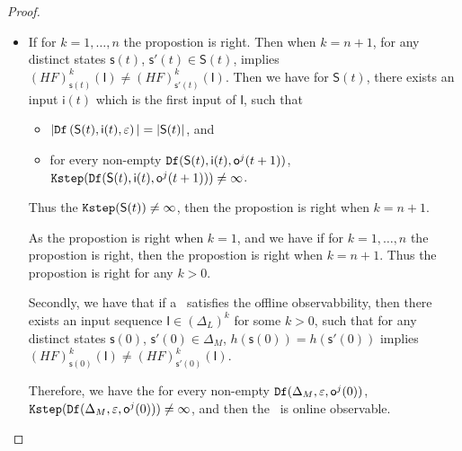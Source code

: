 \begin{appendices}
\begin{proof}
\begin{itemize}
\item If for $k=1,\ldots, n$ the propostion is right. Then when $k=n+1$, for any distinct states $\mathsf{s}(t)$, $\mathsf{s}'(t) \in \mathsf{S}(t)$, implies $(HF)^{k}_{\mathsf{s}(t)}(\mathsf{I})\neq (HF)^{k}_{\mathsf{s}'(t)}(\mathsf{I})$. Then we have for $\mathsf{S}(t)$,
 there exists an input $\mathsf{i}(t)$ which is the first input of $\mathsf{I}$, such that
 \begin{itemize}
\item  $|{\tt Df}\left(\mathsf{S}(t),\mathsf{i}(t),\varepsilon\right)|=|\mathsf{S}(t)|$, and 
 \item  for every non-empty ${\tt Df}(\mathsf{S}(t),\mathsf{i}(t),\mathsf{o}^{j}(t+1))$, ${\tt Kstep}({\tt Df}(\mathsf{S}(t),\mathsf{i}(t),\mathsf{o}^{j}(t+1)))\ne \infty$.
 \end{itemize}
Thus the ${\tt Kstep}(\mathsf{S}(t))\ne \infty$, then the propostion is right when $k =n+1$.

As the propostion is right when $k =1$, and we have if for $k=1,\ldots, n$ the propostion is right, then the propostion is right when $k=n+1$. Thus the propostion is right for any $k>0$.

Secondly, we have that if a \BCN\ satisfies the offline observabbility, then there exists an input sequence $\mathsf{I}\in(\Delta_L)^{k}$ for some $k >0$, such that for any distinct states $\mathsf{s}(0)$, $\mathsf{s}'(0) \in \Delta_M$, $h(\mathsf{s}(0))=h(\mathsf{s}'(0))$ implies $(HF)^{k}_{\mathsf{s}(0)}(\mathsf{I})\neq (HF)^{k}_{\mathsf{s}'(0)}(\mathsf{I})$. 

Therefore, we have the for every non-empty ${\tt Df}(\Delta_M,\varepsilon, \mathsf{o}^{j}(0))$, ${\tt Kstep}({\tt Df}(\Delta_M,\varepsilon,\mathsf{o}^{j}(0)))\ne \infty$, and then the \BCN\ is online observable.
 \end{itemize}
\end{proof}

\end{appendices}
